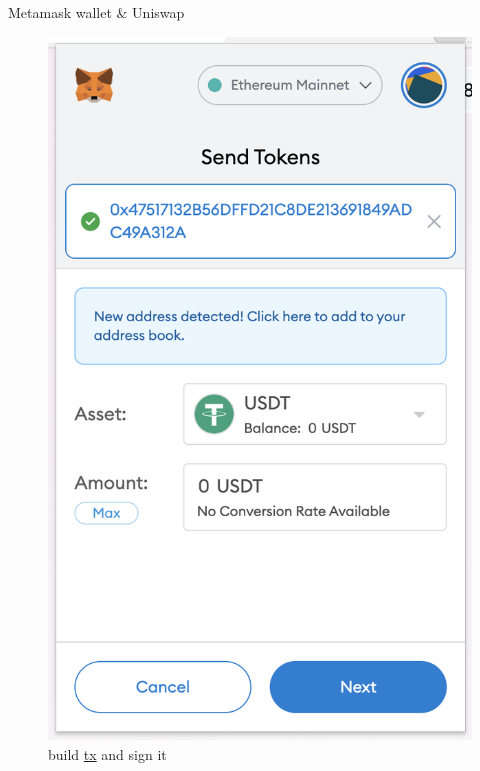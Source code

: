 \begin{frame}[fragile]{Metamask wallet \& Uniswap}
  \begin{minipage}{.49\linewidth}
  \begin{figure}
  \includegraphics[scale=0.35]{metamask_erc20_transfer.png}
  \caption*{build \href{https://etherscan.io/tx/0x49f98d79de29dfdf7b78969cf32f4cfdce0887dbdbad691db0e94ce3bf29487a}{tx} and sign it}
  \end{figure}
  \end{minipage}
  \begin{minipage}{.49\linewidth}
  \begin{figure}

\end{figure}
\end{minipage}
\end{frame}
